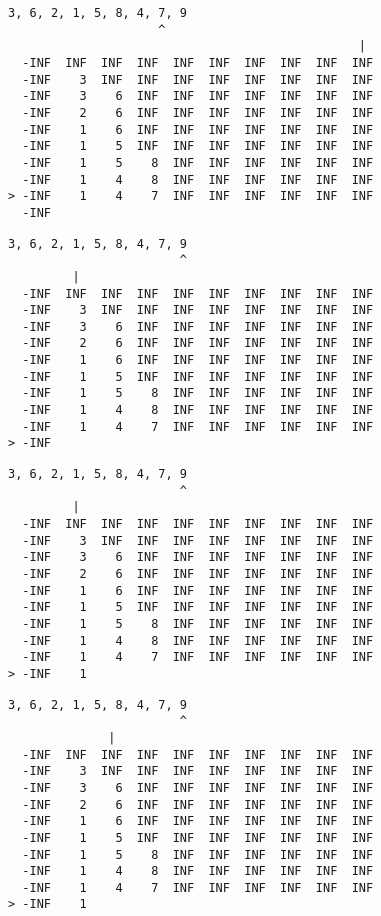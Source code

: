 { \begin{verbatim}
3, 6, 2, 1, 5, 8, 4, 7, 9
                     ^
                                                 |
  -INF  INF  INF  INF  INF  INF  INF  INF  INF  INF
  -INF    3  INF  INF  INF  INF  INF  INF  INF  INF
  -INF    3    6  INF  INF  INF  INF  INF  INF  INF
  -INF    2    6  INF  INF  INF  INF  INF  INF  INF
  -INF    1    6  INF  INF  INF  INF  INF  INF  INF
  -INF    1    5  INF  INF  INF  INF  INF  INF  INF
  -INF    1    5    8  INF  INF  INF  INF  INF  INF
  -INF    1    4    8  INF  INF  INF  INF  INF  INF
> -INF    1    4    7  INF  INF  INF  INF  INF  INF
  -INF                                             
\end{verbatim} }

{ \begin{verbatim}
3, 6, 2, 1, 5, 8, 4, 7, 9
                        ^
         |
  -INF  INF  INF  INF  INF  INF  INF  INF  INF  INF
  -INF    3  INF  INF  INF  INF  INF  INF  INF  INF
  -INF    3    6  INF  INF  INF  INF  INF  INF  INF
  -INF    2    6  INF  INF  INF  INF  INF  INF  INF
  -INF    1    6  INF  INF  INF  INF  INF  INF  INF
  -INF    1    5  INF  INF  INF  INF  INF  INF  INF
  -INF    1    5    8  INF  INF  INF  INF  INF  INF
  -INF    1    4    8  INF  INF  INF  INF  INF  INF
  -INF    1    4    7  INF  INF  INF  INF  INF  INF
> -INF                                             
\end{verbatim} }

{ \begin{verbatim}
3, 6, 2, 1, 5, 8, 4, 7, 9
                        ^
         |
  -INF  INF  INF  INF  INF  INF  INF  INF  INF  INF
  -INF    3  INF  INF  INF  INF  INF  INF  INF  INF
  -INF    3    6  INF  INF  INF  INF  INF  INF  INF
  -INF    2    6  INF  INF  INF  INF  INF  INF  INF
  -INF    1    6  INF  INF  INF  INF  INF  INF  INF
  -INF    1    5  INF  INF  INF  INF  INF  INF  INF
  -INF    1    5    8  INF  INF  INF  INF  INF  INF
  -INF    1    4    8  INF  INF  INF  INF  INF  INF
  -INF    1    4    7  INF  INF  INF  INF  INF  INF
> -INF    1                                        
\end{verbatim} }

{ \begin{verbatim}
3, 6, 2, 1, 5, 8, 4, 7, 9
                        ^
              |
  -INF  INF  INF  INF  INF  INF  INF  INF  INF  INF
  -INF    3  INF  INF  INF  INF  INF  INF  INF  INF
  -INF    3    6  INF  INF  INF  INF  INF  INF  INF
  -INF    2    6  INF  INF  INF  INF  INF  INF  INF
  -INF    1    6  INF  INF  INF  INF  INF  INF  INF
  -INF    1    5  INF  INF  INF  INF  INF  INF  INF
  -INF    1    5    8  INF  INF  INF  INF  INF  INF
  -INF    1    4    8  INF  INF  INF  INF  INF  INF
  -INF    1    4    7  INF  INF  INF  INF  INF  INF
> -INF    1                                        
\end{verbatim} }

